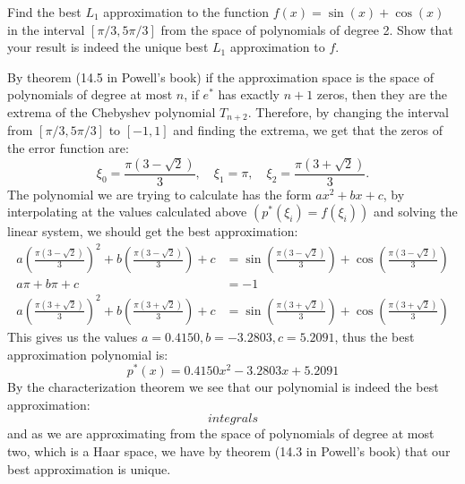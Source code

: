 \begin{problem}
Find the best $L_1$ approximation to the function $f(x) = \sin(x) + \cos(x)$ in the interval $[\pi/3, 5\pi/3]$ from the space of polynomials of degree 2. Show that your result is indeed the unique best $L_1$ approximation to $f$.
\end{problem}

\begin{solution}
By theorem (14.5 in Powell's book) if the approximation space is the space of polynomials of degree at most $n$, if $e^*$ has exactly $n+1$ zeros, then they are the extrema of the Chebyshev polynomial $T_{n+2}$. Therefore, by changing the interval from $[\pi/3, 5\pi/3]$ to $[-1,1]$ and finding the extrema, we get that the zeros of the error function are:
\begin{equation*}
\xi_0 = \frac{\pi(3-\sqrt{2})}{3}, \quad \xi_1 = \pi, \quad \xi_2 = \frac{\pi(3+\sqrt{2})}{3}.
\end{equation*}
The polynomial we are trying to calculate has the form $ax^2+bx+c$, by interpolating at the values calculated above $(p^*(\xi_i) = f(\xi_i))$ and solving the linear system, we should get the best approximation:
\begin{align*}
a(\frac{\pi(3-\sqrt{2})}{3})^2+b(\frac{\pi(3-\sqrt{2})}{3})+c &= \sin(\frac{\pi(3-\sqrt{2})}{3}) + \cos(\frac{\pi(3-\sqrt{2})}{3}) \\
a \pi + b\pi +c &=-1 \\
a(\frac{\pi(3+\sqrt{2})}{3})^2 +b(\frac{\pi(3+\sqrt{2})}{3}) + c &= \sin(\frac{\pi(3+\sqrt{2})}{3}) + \cos(\frac{\pi(3+\sqrt{2})}{3})
\end{align*}
This gives us the values $a=0.4150, b = -3.2803, c = 5.2091$, thus the best approximation polynomial is:
\begin{equation*}
p^*(x)=0.4150x^2 -3.2803x+5.2091
\end{equation*}
By the characterization theorem we see that our polynomial is indeed the best approximation:
\begin{equation*}
integrals
\end{equation*}
and as we are approximating from the space of polynomials of degree at most two, which is a Haar space, we have by theorem (14.3 in Powell's book) that our best approximation is unique.
\end{solution}

